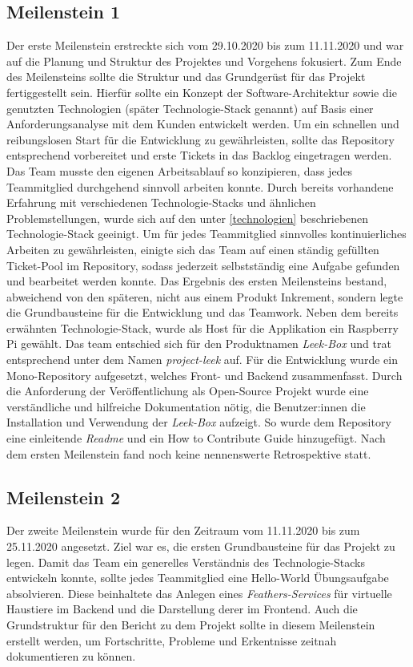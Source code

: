 \documentclass[10pt, a4paper]{article}
\begin{document}
\begin{onehalfspace}
\subsection{Meilenstein 1}
Der erste Meilenstein erstreckte sich vom 29.10.2020 bis zum 11.11.2020 und war auf die Planung und Struktur des Projektes und Vorgehens fokusiert.
Zum Ende des Meilensteins sollte die Struktur und das Grundgerüst für das Projekt fertiggestellt sein.
Hierfür sollte ein Konzept der Software-Architektur sowie die genutzten Technologien (später Technologie-Stack genannt) auf Basis einer Anforderungsanalyse mit dem Kunden entwickelt werden.
Um ein schnellen und reibungslosen Start für die Entwicklung zu gewährleisten, sollte das Repository entsprechend vorbereitet und erste Tickets in das Backlog eingetragen werden.
Das Team musste den eigenen Arbeitsablauf so konzipieren, dass jedes Teammitglied durchgehend sinnvoll arbeiten konnte.
Durch bereits vorhandene Erfahrung mit verschiedenen Technologie-Stacks und ähnlichen Problemstellungen, wurde sich auf den unter \autoref{technologien} beschriebenen Technologie-Stack geeinigt.
Um für jedes Teammitglied sinnvolles kontinuierliches Arbeiten zu gewährleisten, einigte sich das Team auf einen ständig gefüllten Ticket-Pool im Repository, sodass jederzeit selbstständig eine Aufgabe gefunden und bearbeitet werden konnte.
Das Ergebnis des ersten Meilensteins bestand, abweichend von den späteren, nicht aus einem Produkt Inkrement, sondern legte die Grundbausteine für die Entwicklung und das Teamwork.
Neben dem bereits erwähnten Technologie-Stack, wurde als Host für die Applikation ein Raspberry Pi gewählt.
Das team entschied sich für den Produktnamen \textit{Leek-Box} und trat entsprechend unter dem Namen \textit{project-leek} auf.
Für die Entwicklung wurde ein Mono-Repository aufgesetzt, welches Front- und Backend zusammenfasst.
Durch die Anforderung der Veröffentlichung als Open-Source Projekt wurde eine verständliche und hilfreiche Dokumentation nötig, die Benutzer:innen die Installation und Verwendung der \textit{Leek-Box} aufzeigt.
So wurde dem Repository eine einleitende \textit{Readme} und ein \glqq How to Contribute\grqq{} Guide hinzugefügt.
Nach dem ersten Meilenstein fand noch keine nennenswerte Retrospektive statt.

\subsection{Meilenstein 2}
Der zweite Meilenstein wurde für den Zeitraum vom 11.11.2020 bis zum 25.11.2020 angesetzt.
Ziel war es, die ersten Grundbausteine für das Projekt zu legen. Damit das Team ein generelles Verständnis des Technologie-Stacks entwickeln konnte,
sollte jedes Teammitglied eine \glqq Hello-World\grqq{} Übungsaufgabe absolvieren. Diese beinhaltete das Anlegen eines \textit{Feathers-Services} für virtuelle
Haustiere im Backend und die Darstellung derer im Frontend. Auch die Grundstruktur für den Bericht zu dem Projekt sollte in diesem Meilenstein erstellt werden,
um Fortschritte, Probleme und Erkentnisse zeitnah dokumentieren zu können.
\\~\\

\end{onehalfspace}
\end{document}
